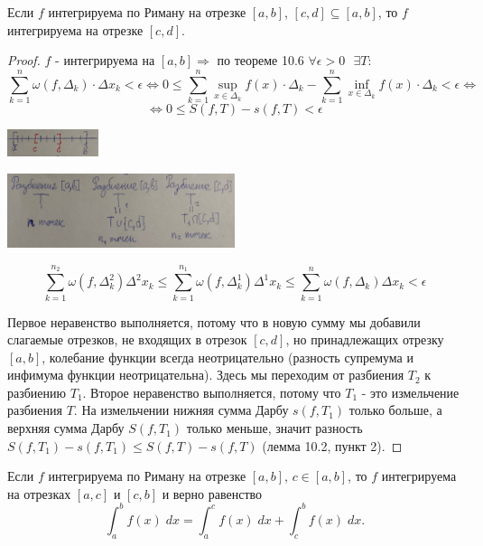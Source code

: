     \begin{corollary}
    	Если $f$ интегрируема по Риману на отрезке $[a, b]$, $[c, d] \subseteq [a, b]$, то $f$ интегрируема на отрезке $[c, d]$.
    \end{corollary}
    
    \begin{proof}
    	$f$ - интегрируема на $[a, b] \Rightarrow$ по теореме 10.6 $\forall \epsilon > 0 \text{ } \exists T:$
    	\[ \sum_{k = 1}^n \omega(f, \Delta_k) \cdot \Delta x_k < \epsilon \Leftrightarrow 0 \leqslant \sum_{k = 1}^n \sup_{x \in \Delta_k} {f(x)} \cdot \Delta_k - \sum_{k = 1}^n \inf_{x \in \Delta_k} {f(x)} \cdot \Delta_k < \epsilon \Leftrightarrow \]
    	\[ \Leftrightarrow 0 \leqslant S(f, T) - s(f, T) < \epsilon \]
    	\begin{center}
    		\includegraphics[width=0.2\textwidth]{img/lecture28/scheme_segments}
    	\end{center}
    	\begin{center}
    		\includegraphics[width=0.5\textwidth]{img/lecture28/partition_designations}
    	\end{center}
    	\[ \sum_{k = 1}^{n_2} \omega(f, \Delta^2_k) \Delta^2 x_k \leqslant \sum_{k = 1}^{n_1} \omega(f, \Delta^1_k) \Delta^1 x_k \leqslant \sum_{k = 1}^n \omega(f, \Delta_k) \Delta x_k < \epsilon \]
    	
    	Первое неравенство выполняется, потому что в новую сумму мы добавили слагаемые отрезков, не входящих в отрезок $[c, d]$, но принадлежащих отрезку $[a, b]$, колебание функции всегда неотрицательно (разность супремума и инфимума функции неотрицательна). Здесь мы переходим от разбиения $T_2$ к разбиению $T_1$. Второе неравенство выполняется, потому что $T_1$ - это измельчение разбиения $T$. На измельчении нижняя сумма Дарбу $s(f, T_1)$ только больше, а верхняя сумма Дарбу $S(f, T_1)$ только меньше, значит разность $S(f, T_1) - s(f, T_1) \leqslant S(f, T) - s(f, T)$ (лемма 10.2, пункт 2).
    \end{proof}
    
    \begin{corollary}
    	Если $f$ интегрируема по Риману на отрезке $[a, b]$, $c \in [a, b]$, то $f$ интегрируема на отрезках $[a, c]$ и $[c, b]$ и верно равенство
    	\[ \int_a^b f(x) \; dx = \int_a^c f(x) \; dx + \int_c^b f(x) \; dx. \]
    \end{corollary}
    
